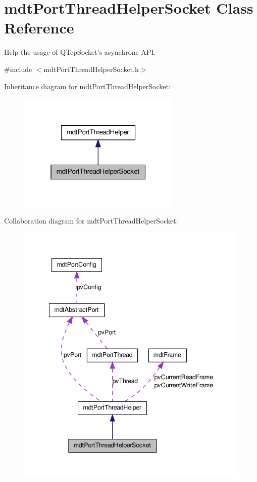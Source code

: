 \hypertarget{classmdt_port_thread_helper_socket}{
\section{mdtPortThreadHelperSocket Class Reference}
\label{classmdt_port_thread_helper_socket}
}


Help the usage of QTcpSocket's asynchrone API.  




{\ttfamily \#include $<$mdtPortThreadHelperSocket.h$>$}



Inheritance diagram for mdtPortThreadHelperSocket:
\nopagebreak
\begin{figure}[H]
\begin{center}
\leavevmode
\includegraphics[width=220pt]{classmdt_port_thread_helper_socket__inherit__graph}
\end{center}
\end{figure}


Collaboration diagram for mdtPortThreadHelperSocket:
\nopagebreak
\begin{figure}[H]
\begin{center}
\leavevmode
\includegraphics[width=342pt]{classmdt_port_thread_helper_socket__coll__graph}
\end{center}
\end{figure}
